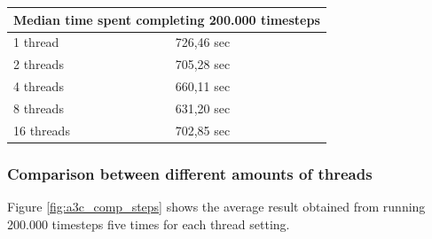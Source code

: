 \documentclass[11pt]{article}
\begin{document}
\begin{tabular}{ |l|l| }
    \label{tab:time}
  \hline
  \multicolumn{2}{|c|}{Median time spent completing 200.000 timesteps} \\
  \hline
  1 thread & 726,46 sec \\
  2 threads & 705,28 sec\\
  4 threads & 660,11 sec\\
  8 threads & 631,20 sec\\
  16 threads & 702,85 sec\\
  \hline
\end{tabular}



\subsubsection{Comparison between different amounts of threads}

Figure \ref{fig:a3c_comp_steps} shows the average result obtained from running 200.000
timesteps five times for each thread setting.
\end{document}
